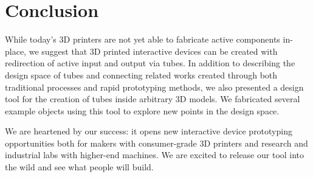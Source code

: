\section{Conclusion}
While today's 3D printers are not yet able to fabricate active components in-place, we suggest that 3D printed interactive devices can be created with redirection of active input and output via tubes.  In addition to describing the design space of tubes and connecting related works created through both traditional processes and rapid prototyping methods, we also presented a design tool for the creation of tubes inside arbitrary 3D models.  We fabricated several example objects using this tool to explore new points in the design space.

We are heartened by our success: it opens new interactive device prototyping opportunities both for makers with consumer-grade 3D printers and research and industrial labs with higher-end machines.  We are excited to release our tool into the wild and see what people will build.